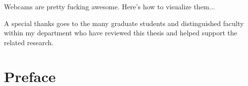 %

\begin{thesistitlepage}               %
\end{thesistitlepage}

\begin{thesisabstract}
Webcams are pretty fucking awesome.  Here's how to visualize them...
\end{thesisabstract}

\begin{thesisacknowledgments}

A special thanks goes to the many graduate students and distinguished faculty
within my department who have reviewed this thesis and helped support the
related research.
\end{thesisacknowledgments}


\begin{singlespace}
\tableofcontents


\listoftables

\listoffigures
\end{singlespace}

\chapter{Preface}

